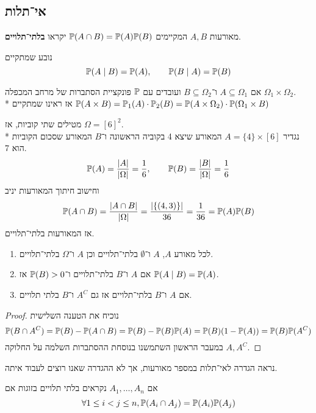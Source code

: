 \subsection{אי־תלות}
\begin{definition}
	מאורעות $A, B$ המקיימים $\mathbb{P}(A \cap B) = \mathbb{P}(A) \mathbb{P}(B)$ יקראו \textbf{בלתי־תלויים}.
\end{definition}
\begin{remark}
	נובע שמתקיים
	\[
		\mathbb{P}(A \mid B) = \mathbb{P}(A),
		\qquad
		\mathbb{P}(B \mid A) = \mathbb{P}(B)
	\]
\end{remark}
\begin{remark}[תזכורת]
	אם $A \subseteq \Omega_1$ ו־$B \subseteq \Omega_2$ ועובדים עם $\mathbb{P}$ פונקציית הסתברות של מרחב המכפלה $\Omega_1 \times \Omega_2$. \\*
	אז ראינו שמתקיים $\mathbb{P}(A \times B) = \mathbb{P}_1(A) \cdot \mathbb{P}_2(B) = \mathbb{P}(A \times \Omega_2) \cdot \mathbb{P}(\Omega_1 \times B)$
\end{remark}
\begin{example}
	מטילים שתי קוביות, אז $\Omega = {[6]}^2$. \\*
	נגדיר $A = \{ 4 \} \times [6]$ המאורע שיצא 4 בקוביה הראשונה ו־$B$ המאורע שסכום הקוביות הוא 7.
	\[
		\mathbb{P}(A) = \frac{|A|}{|\Omega|} = \frac{1}{6},
		\qquad
		\mathbb{P}(B) = \frac{|B|}{|\Omega|} = \frac{1}{6}
	\]
	וחישוב חיתוך המאורעות יניב
	\[
		\mathbb{P}(A \cap B) = \frac{|A \cap B|}{|\Omega|} = \frac{|\{(4, 3)\}|}{36} = \frac{1}{36} = \mathbb{P}(A) \mathbb{P}(B)
	\]
	אז המאורעות בלתי־תלויים.
\end{example}
\begin{proposition}
	\begin{enumerate}
		\item לכל מאורע $A$, $A$ ו־$\emptyset$ בלתי־תלויים וכן $A$ ו־$\Omega$ בלתי־תלויים.
		\item אם $A$ ו־$B$ בלתי־תלויים ו־$\mathbb{P}(B) > 0$ אז $\mathbb{P}(A \mid B) = \mathbb{P}(A)$.
		\item אם $A$ ו־$B$ בלתי־תלויים אז גם $A^C$ ו־$B$ בלתי תלויים.
	\end{enumerate}
\end{proposition}
\begin{proof}
	נוכיח את הטענה השלישית
	\[
		\mathbb{P}(B \cap A^C)
		= \mathbb{P}(B) - \mathbb{P}(A \cap B)
		= \mathbb{P}(B) - \mathbb{P}(B) \mathbb{P}(A)
		= \mathbb{P}(B) (1 - \mathbb{P}(A))
		= \mathbb{P}(B) \mathbb{P}(A^C)
	\]
	במעבר הראשון השתמשנו בנוסחת ההסתברות השלמה על החלוקה $A, A^C$.
\end{proof}
נראה הגדרה לאי־תלות במספר מאורעות, אך לא ההגדרה שאנו רוצים לעבוד איתה.
\begin{definition}
	אם $A_1, \dots, A_n$ נקראים בלתי תלויים בזוגות אם
	\[
		\forall 1 \le i < j \le n, \mathbb{P}(A_i \cap A_j) = \mathbb{P}(A_i) \mathbb{P}(A_j)
	\]
\end{definition}
